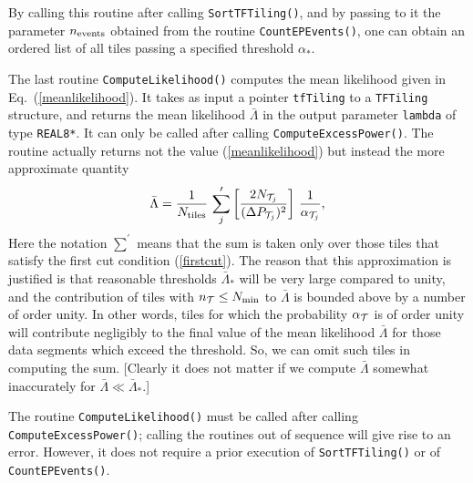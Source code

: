 \documentclass{article}
\begin{document}
By calling this routine after calling \verb+SortTFTiling()+, and by
passing to it the parameter $n_{\rm events}$ obtained from the routine
\verb+CountEPEvents()+, one can obtain an ordered list of all tiles
passing a specified threshold $\alpha_*$.








The last routine \verb+ComputeLikelihood()+ computes the mean
likelihood given in Eq.\ (\ref{meanlikelihood}).  It takes as input a
pointer \verb+tfTiling+ to a \verb+TFTiling+ structure, and returns
the mean likelihood ${\bar \Lambda}$ in the output parameter
\verb+lambda+ of type \verb+REAL8*+.  It can only be called after calling
\verb+ComputeExcessPower()+.  The routine actually returns not the
value (\ref{meanlikelihood}) but instead the more approximate
quantity  
\begin{equation}
{\bar \Lambda} = {1 \over N_{\rm tiles}} \, \sum_j^\prime \left[{2 N_{{\cal
T}_j} \over (\Delta P_{{\cal T}_j})^2 } \right] \, {1 \over
\alpha_{{\cal T}_j}},
\label{meanlikelihood1}
\end{equation}
Here the notation $\sum^\prime$ means that the sum is taken only over
those tiles that satisfy the first cut condition (\ref{firstcut}).
The reason that this approximation is justified is that reasonable
thresholds ${\bar \Lambda}_*$ will be very large compared to unity,
and the contribution of tiles with $n_{\cal T} \le N_{\rm min}$ to
${\bar \Lambda}$ is bounded above by a number of order unity.  In
other words, tiles for 
which the probability $\alpha_{\cal T}$ is of order unity will
contribute negligibly to the final value of the mean likelihood ${\bar
\Lambda}$ for those data segments which exceed the threshold.  So, we
can omit such tiles in computing the sum.  [Clearly it does not matter
if we compute ${\bar \Lambda}$ somewhat inaccurately for ${\bar
\Lambda} \ll {\bar \Lambda}_*$.] 

The routine \verb+ComputeLikelihood()+ must be called
after calling \verb+ComputeExcessPower()+; calling the routines out of 
sequence will give rise to an error.  However, it does not require
a prior execution of \verb+SortTFTiling()+ or of \verb+CountEPEvents()+.  
\end{document}

